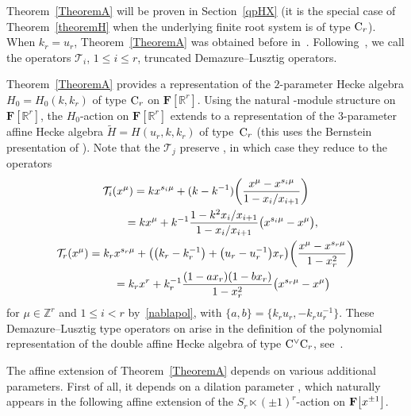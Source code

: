 \documentclass[pdftex]{sigma}
\numberwithin{equation}{section}
\begin{document}
{Theorem~\ref{TheoremA} will be proven in Section~\ref{qpHX} (it is the special case of Theorem~\ref{theoremH} when the underlying finite root system is of type ${\rm C}_r$).
When $k_r=u_r$, Theorem~\ref{TheoremA} was obtained before in~\cite{SSV2, SSV1}. Following~\cite{SSV2}, we call the operators $\mathcal{T}_i$, $1\leq i\leq r$, truncated Demazure--Lusztig operators.

Theorem~\ref{TheoremA} provides a representation of the $2$-parameter Hecke algebra $H_0=H_0(k,k_r)$ of type ${\rm C}_r$ on $\mathbf{F}[\mathbb{R}^r]$.
Using the natural -module structure on $\mathbf{F}[\mathbb{R}^r]$, the $H_0$-action on $\mathbf{F}[\mathbb{R}^r]$ extends to a representation of the $3$-parameter affine Hecke algebra $\widetilde{H}=H(u_r,k,k_r)$ of type~${\rm C}_r$ \big(this uses the Bernstein presentation
of \big). Note that the $\mathcal{T}_j$ preserve , in which case they reduce to the operators
\begin{gather}
\mathcal{T}_i(x^\mu)=kx^{s_i\mu}+(k-k^{-1})\biggl(\frac{x^\mu-x^{s_i\mu}}{1-x_i/x_{i+1}}\biggr)\nonumber\\
\hphantom{\mathcal{T}_i(x^\mu)}{}
=kx^\mu+k^{-1}\frac{1-k^2x_i/x_{i+1}}{1-x_i/x_{i+1}}\bigl(x^{s_i\mu}-x^\mu\bigr),\nonumber\\
\mathcal{T}_r(x^\mu)=k_rx^{s_r\mu}+\bigl(\bigl(k_r-k_r^{-1}\bigr)+\bigl(u_r-u_r^{-1}\bigr)x_r\bigr)\biggl(\frac{x^\mu-x^{s_r\mu}}{1-x_r^2}\biggr)\nonumber\\
\hphantom{\mathcal{T}_r(x^\mu)}{}
=k_rx^r+k_r^{-1}\frac{(1-ax_r)(1-bx_r)}{1-x_r^2}\bigl(x^{s_r\mu}-x^\mu\bigr)\label{tauipol}
\end{gather}
for $\mu\in\mathbb{Z}^r$ and $1\leq i<r$ by~\eqref{nablapol}, with $\{a,b\}=\bigl\{k_ru_r,-k_ru_r^{-1}\bigr\}$. These Demazure--Lusztig type operators on  arise in the definition of the polynomial representation of the double affine Hecke algebra
of type ${\rm C}^\vee{\rm C}_r$, see~\cite{No,Sa}.

\mypar\label{1.3}
The affine extension of Theorem~\ref{TheoremA}
depends on various additional parameters. First of all, it depends on a dilation parameter , which naturally appears in the following affine extension of the $S_r\ltimes (\pm 1)^r$-action on $\mathbf{F}\smash{\bigl[x^{\pm 1}\bigr]}$.

}
\end{document}
